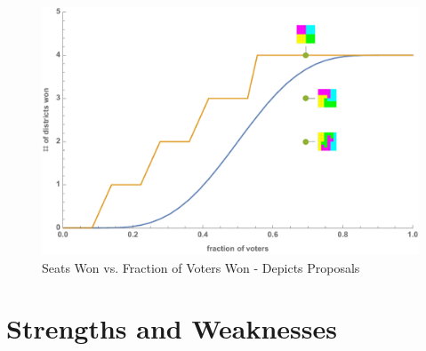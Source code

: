 \documentclass[12pt]{article}
\begin{document}
    \begin{figure}[h!]
    \centering
    \includegraphics[scale=0.7]{c.pdf}
    \caption{Seats Won vs. Fraction of Voters Won - Depicts Proposals}
    \label{fig:cdf_fancy}
    \end{figure}
\section{Strengths and Weaknesses}
\end{document}
